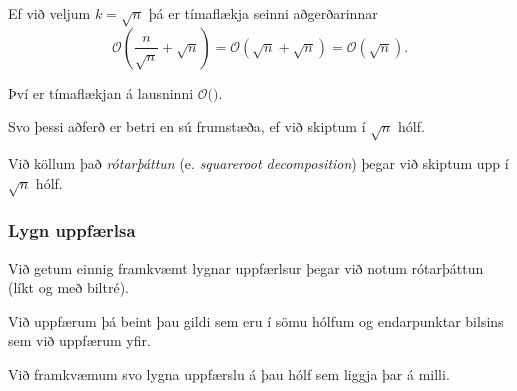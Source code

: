 {
	{
		\item<1-> Ef við veljum $k = \sqrt{n}$ þá er tímaflækja seinni aðgerðarinnar
			\[
				\mathcal{O} \left (\frac{n}{\sqrt{n}} + \sqrt{n}\right ) = \mathcal{O} (\sqrt{n} + \sqrt{n}) = \mathcal{O} (\sqrt{n}).
			\]
		\item<2-> Því er tímaflækjan á lausninni $\mathcal{O}($\onslide<3->{$q\sqrt{n}$}$)$.
		\item<4-> Svo þessi aðferð er betri en sú frumstæða, ef við skiptum í $\sqrt{n}$ hólf.
		\item<5-> Við köllum það \emph{rótarþáttun} (e. \emph{squareroot decomposition}) þegar við skiptum upp í $\sqrt{n}$ hólf.
	}
}

{
}

{
	\frametitle{Lygn uppfærlsa}
	{
		\item<1-> Við getum einnig framkvæmt lygnar uppfærlsur þegar við notum rótarþáttun (líkt og með biltré).
		\item<2-> Við uppfærum þá beint þau gildi sem eru í sömu hólfum og endarpunktar bilsins sem við uppfærum yfir.
		\item<3-> Við framkvæmum svo lygna uppfærslu á þau hólf sem liggja þar á milli.
	}
}

{
}

{
}


